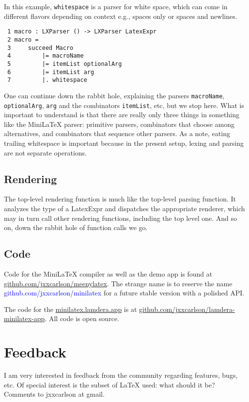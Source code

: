 \documentclass[11pt, oneside]{article}
\newcommand{\code}[1]{{\tt #1}}
\newcommand{\blue}[1]{\textcolor{blue}{#1}}
\begin{document}
In  this  example,   \code{whitespace} is  a  parser  for  white  space,  which  can  come  in  different  flavors  depending  on  context  e.g.,  spaces  only  or  spaces  and  newlines.


\begin{verbatim}
 1 macro : LXParser () -> LXParser LatexExpr
 2 macro =
 3     succeed Macro
 4         |= macroName
 5         |= itemList optionalArg
 6         |= itemList arg
 7         |. whitespace
\end{verbatim}
One  can  continue  down  the  rabbit  hole,  explaining  the  parsers    \code{macroName},   \code{optionalArg},    \code{arg} and  the  combinators   \code{itemList},  etc,  but  we  stop  here.   What  is  important  to  understand  is  that  there  are  really  only  three  things  in  something  like  the  MiniLaTeX  parser:  primitive  parsers,  combinators  that  choose  among  alternatives,  and  combinators  that  sequence  other  parsers.  As  a  note,  eating trailing  whitespace  is important because  in the present setup,  lexing  and  parsing  are  not  separate  operations.


 \subsection{Rendering}
The  top-level  rendering  function  is  much  like  the  top-level  parsing  function.  It  analyzes  the  type  of  a  LatexExpr  and  dispatches  the  appropriate renderer,  which  may  in  turn  call  other  rendering  functions,  including  the  top  level  one.  And  so  on,  down  the  rabbit  hole  of  function  calls  we  go.


 \subsection{Code}
Code  for  the  MiniLaTeX  compiler  as  well  as  the  demo  app  is  found  at   \href{https://github.com/jxxcarlson/meenylatex}{github.com/jxxcarlson/meenylatex}.   The  strange  name  is  to  reserve  the  name   \blue{github.com/jxxcarlson/minilatex} for  a  future  stable  version  with  a  polished  API.

The  code  for  the   \href{https://minilatex.lamdera.app}{minilatex.lamdera.app} is  at   \href{https://github.com/jxxcarlson/lamdera-minilatex-app}{github.com/jxxcarlson/lamdera-minilatex-app}.
All  code  is  open  source.


 \section{Feedback}
I  am  very  interested  in  feedback  from  the  community  regarding  features,  bugs,  etc.   Of  special  interest  is  the  subset  of  LaTeX  used:  what  should  it  be?
Comments  to  jxxcarlson  at  gmail.
\end{document}
